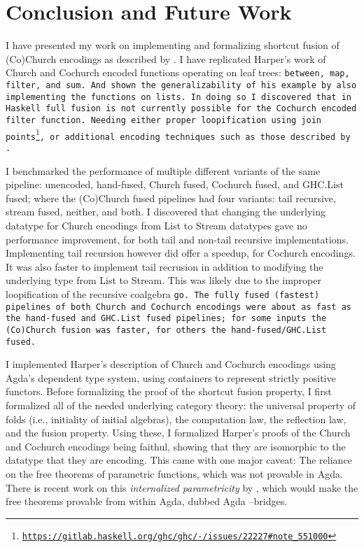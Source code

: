 \section{Conclusion and Future Work}\label{sec:conclusion}
I have presented my work on implementing and formalizing shortcut fusion of (Co)Church encodings as described by \cite{Harper2011}.
I have replicated Harper's work of Church and Cochurch encoded functions operating on leaf trees: \tt{between}, \tt{map}, \tt{filter}, and \tt{sum}.
And shown the generalizability of his example by also implementing the functions on lists.
In doing so I discovered that in Haskell full fusion is not currently possible for the Cochurch encoded filter function.
Needing either proper loopification using join points\footnote{\url{https://gitlab.haskell.org/ghc/ghc/-/issues/22227\#note_551000}}, or additional encoding techniques such as those described by \cite{Coutts2007}.

I benchmarked the performance of multiple different variants of the same pipeline: unencoded, hand-fused, Church fused, Cochurch fused, and GHC.List fused; where the (Co)Church fused pipelines had four variants: tail recursive, stream fused, neither, and both.
I discovered that changing the underlying datatype for Church encodings from List to Stream datatypes gave no performance improvement, for both tail and non-tail recursive implementations. Implementing tail recursion however did offer a speedup, for Cochurch encodings.
It was also faster to implement tail recrusion in addition to modifying the underlying type from List to Stream.
This was likely due to the improper loopification of the recursive coalgebra \tt{go}.
The fully fused (fastest) pipelines of both Church and Cochurch encodings were about as fast as the hand-fused and GHC.List fused pipelines; for some inputs the (Co)Church fusion was faster, for others the hand-fused/GHC.List fused.

I implemented Harper's description of Church and Cochurch encodings using Agda's dependent type system, using containers to represent strictly positive functors.
Before formalizing the proof of the shortcut fusion property, I first formalized all of the needed underlying category theory: the universal property of folds (i.e., initiality of initial algebras), the computation law, the reflection law, and the fusion property.
Using these, I formalized Harper's proofs of the Church and Cochurch encodings being faithul, showing that they are isomorphic to the datatype that they are encoding.
This came with one major caveat: The reliance on the free theorems of parametric functions, which was not provable in Agda.
There is recent work on this \textit{internalized parametricity} by \cite{Muylder2024}, which would make the free theorems provable from within Agda, dubbed Agda --bridges.

